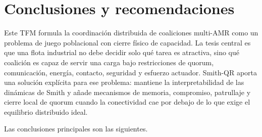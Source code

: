 \section{Conclusiones y recomendaciones}
\label{sec:conclusiones}

Este TFM formula la coordinación distribuida de coaliciones multi-AMR como un problema
de juego poblacional con cierre físico de capacidad. La tesis central es que una flota
industrial no debe decidir solo qué tarea es atractiva, sino qué coalición es capaz de
servir una carga bajo restricciones de quorum, comunicación, energía, contacto,
seguridad y esfuerzo actuador. Smith-QR aporta una solución explícita para ese problema:
mantiene la interpretabilidad de las dinámicas de Smith y añade mecanismos de memoria,
compromiso, patrullaje y cierre local de quorum cuando la conectividad cae por debajo de
lo que exige el equilibrio distribuido ideal.

Las conclusiones principales son las siguientes.

